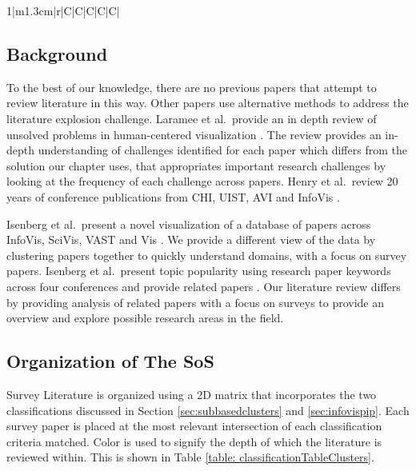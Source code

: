 \begin{table}[p]
\begin{tabularx}{1\textwidth}{|m{1.3cm}|r|C|C|C|C|C|}
\end{tabularx}
\caption{\scriptsize A 3-Dimensional hierarchical classification table depicting the categorization of all the survey papers. \colorbox{lime}{Green Highlighting} represents survey's summarised within the SoS. \colorbox{yellow}{Yellow Highlighting} represents surveys that were not summarised in detail due to prioritization of journals or size constraints. \colorbox{pink}{Pink Highlighting} represents survey's not reviewed in detail within the literature review due to year constraints discussed in the Scope (Section \ref{sec:scope}). }\label{table: classificationTableClusters}
\end{table}

\subsection{Background}
To the best of our knowledge, there are no previous papers that attempt to review literature in this way. Other papers use alternative methods to address the literature explosion challenge. Laramee et al.\ provide an in depth review of unsolved problems in human-centered visualization \cite{laramee2007challenges}. The review provides an in-depth understanding of challenges identified for each paper which differs from the solution our chapter uses, that appropriates important research challenges by looking at the frequency of each challenge across papers. Henry et al.\ review 20 years of conference publications from CHI, UIST, AVI and InfoVis \cite{henry200720}.

Isenberg et al.\ present a novel visualization of a database of papers across InfoVis, SciVis, VAST and Vis \cite{isenberg2017VPD}. We provide a different view of the data by clustering papers together to quickly understand domains, with a focus on survey papers. Isenberg et al.\ present topic popularity using research paper keywords across four conferences and provide related papers \cite{isenberg2017visualization}. Our literature review differs by providing analysis of related papers with a focus on surveys to provide an overview and explore possible research areas in the field.

\subsection{Organization of The SoS} 
Survey Literature is organized using a 2D matrix that incorporates the two classifications discussed in Section \ref{sec:subbasedclusters} and \ref{sec:infovispip}. Each survey paper is placed at the most relevant intersection of each classification criteria matched. Color is used to signify the depth of which the literature is reviewed within. This is shown in Table \ref{table: classificationTableClusters}.

